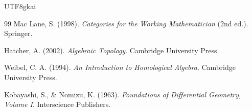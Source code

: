 \documentclass[12pt]{article}
\begin{document}
\begin{CJK*}{UTF8}{gkai}
\begin{thebibliography}{99}
Mac Lane, S. (1998).
\newblock \emph{Categories for the Working Mathematician} (2nd ed.).
\newblock Springer.

Hatcher, A. (2002).
\newblock \emph{Algebraic Topology}.
\newblock Cambridge University Press.

Weibel, C. A. (1994).
\newblock \emph{An Introduction to Homological Algebra}.
\newblock Cambridge University Press.

Kobayashi, S., \& Nomizu, K. (1963).
\newblock \emph{Foundations of Differential Geometry, Volume I}.
\newblock Interscience Publishers.

\end{thebibliography}

\end{CJK*}
\end{document}
